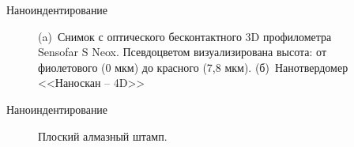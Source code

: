 \documentclass[aspectratio=169]{beamer}
\begin{document}
\begin{frame}{Наноиндентирование}
\begin{figure}
\begin{minipage}{0.45\linewidth}
            \end{minipage}
                \caption*{(a)~Снимок с оптического бесконтактного 3D профилометра Sensofar S Neox. Псевдоцветом визуализирована высота: от фиолетового (0 мкм) до красного (7,8 мкм).  (б)~Нанотвердомер <<Наноскан -- 4D>>}
        \end{figure}
\end{frame}



\begin{frame}{Наноиндентирование}
        \begin{figure}
                \caption*{Плоский алмазный штамп.}
        \end{figure}
\end{frame}
\end{document}
